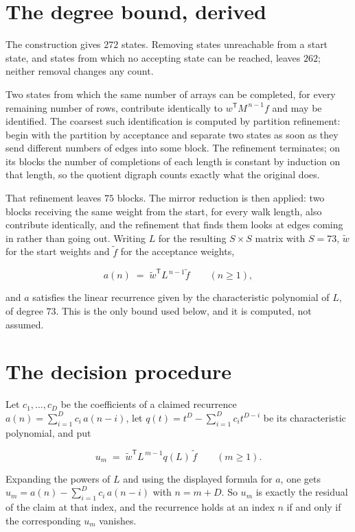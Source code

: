 \documentclass[11pt]{article}
\theoremstyle{definition}
\begin{document}
\section{The degree bound, derived}

The construction gives $272$ states. Removing states unreachable from a start state, and states from which no accepting state can be reached, leaves $262$; neither removal changes any count.

Two states from which the same number of arrays can be completed, for every remaining number of rows, contribute identically to $w^{\mathsf T}M^{\,n-1}f$ and may be identified. The coarsest such identification is computed by partition refinement: begin with the partition by acceptance and separate two states as soon as they send different numbers of edges into some block. The refinement terminates; on its blocks the number of completions of each length is constant by induction on that length, so the quotient digraph counts exactly what the original does.

That refinement leaves $75$ blocks. The mirror reduction is then applied: two blocks receiving the same weight from the start, for every walk length, also contribute identically, and the refinement that finds them looks at edges coming in rather than going out. Writing $L$ for the resulting $S \times S$ matrix with $S = 73$, $\tilde w$ for the start weights and $\tilde f$ for the acceptance weights,

\[a(n) \;=\; \tilde w^{\mathsf T} L^{\,n-1} \tilde f \qquad (n \ge 1),\]

and $a$ satisfies the linear recurrence given by the characteristic polynomial of $L$, of degree $73$. This is the only bound used below, and it is computed, not assumed.

\section{The decision procedure}

Let $c_1,\dots,c_D$ be the coefficients of a claimed recurrence $a(n) = \sum_{i=1}^{D} c_i\,a(n-i)$, let $q(t) = t^{D} - \sum_{i=1}^{D} c_i t^{D-i}$ be its characteristic polynomial, and put

\[u_m \;=\; \tilde w^{\mathsf T} L^{\,m-1} q(L)\,\tilde f \qquad (m \ge 1).\]

Expanding the powers of $L$ and using the displayed formula for $a$, one gets $u_m = a(n) - \sum_{i=1}^{D} c_i\,a(n-i)$ with $n = m + D$. So $u_m$ is exactly the residual of the claim at that index, and the recurrence holds at an index $n$ if and only if the corresponding $u_m$ vanishes.
\end{document}
